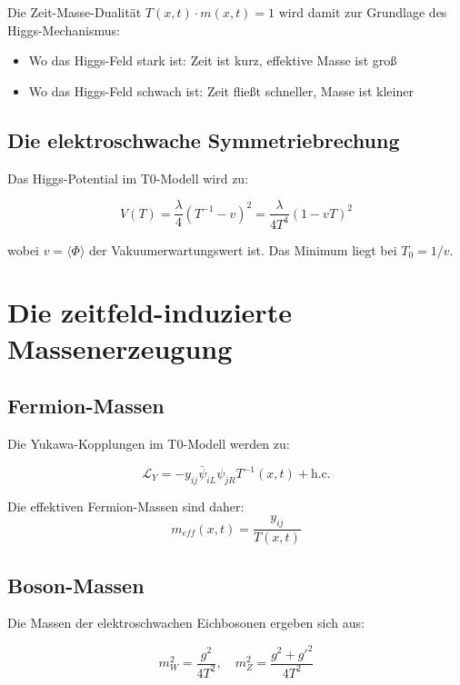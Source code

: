 \documentclass[12pt,a4paper]{report}
\begin{document}
	Die Zeit-Masse-Dualität $T(x,t) \cdot m(x,t) = 1$ wird damit zur Grundlage des Higgs-Mechanismus:
	\begin{itemize}
		\item Wo das Higgs-Feld stark ist: Zeit ist kurz, effektive Masse ist groß
		\item Wo das Higgs-Feld schwach ist: Zeit fließt schneller, Masse ist kleiner
	\end{itemize}
	
	\subsection{Die elektroschwache Symmetriebrechung}
	
	Das Higgs-Potential im T0-Modell wird zu:
	
	\begin{equation}
		V(T) = \frac{\lambda}{4}(T^{-1} - v)^2 = \frac{\lambda}{4T^4}(1 - vT)^2
	\end{equation}
	
	wobei $v = \langle\Phi\rangle$ der Vakuumerwartungswert ist. Das Minimum liegt bei $T_0 = 1/v$.
	
	\section{Die zeitfeld-induzierte Massenerzeugung}
	
	\subsection{Fermion-Massen}
	
	Die Yukawa-Kopplungen im T0-Modell werden zu:
	
	\begin{equation}
		\mathcal{L}_Y = -y_{ij} \bar{\psi}_{iL} \psi_{jR} T^{-1}(x,t) + \text{h.c.}
	\end{equation}
	
	Die effektiven Fermion-Massen sind daher:
	\begin{equation}
		m_{eff}(x,t) = \frac{y_{ij}}{T(x,t)}
	\end{equation}
	
	\subsection{Boson-Massen}
	
	Die Massen der elektroschwachen Eichbosonen ergeben sich aus:
	
	\begin{equation}
		m_W^2 = \frac{g^2}{4T^2}, \quad m_Z^2 = \frac{g^2 + g'^2}{4T^2}
	\end{equation}
	
\end{document}
